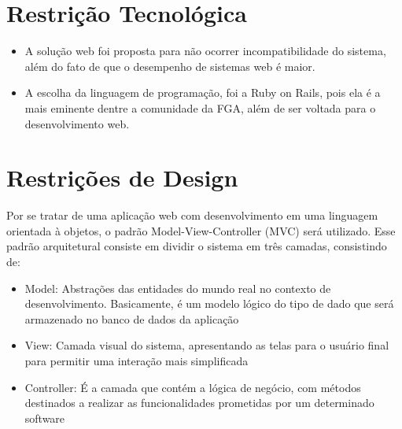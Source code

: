 \begin{apendicesenv}
\section{Restrição Tecnológica}

\begin{itemize}
\item{A solução web foi proposta para não ocorrer incompatibilidade do sistema, além do fato de que o desempenho de sistemas web é maior.}
\item{A escolha da linguagem de programação, foi a Ruby on Rails, pois ela é a mais eminente dentre a comunidade da FGA, além de ser voltada para o desenvolvimento web.}
\end{itemize}

\section{Restrições de Design}

Por se tratar de uma aplicação web com desenvolvimento em uma linguagem orientada à objetos, o padrão Model-View-Controller (MVC) será utilizado. Esse padrão arquitetural consiste em dividir o sistema em três camadas, consistindo de:

\begin{itemize}
\item{Model: Abstrações das entidades do mundo real no contexto de desenvolvimento. Basicamente, é um modelo lógico do tipo de dado que será armazenado no banco de dados da aplicação}
\item{View: Camada visual do sistema, apresentando as telas para o usuário final para permitir uma interação mais simplificada}
\item{Controller: É a camada que contém a lógica de negócio, com métodos destinados a realizar as funcionalidades prometidas por um determinado software}
\end{itemize}


\end{apendicesenv}
